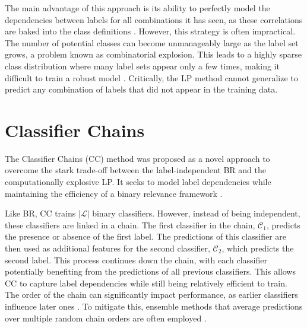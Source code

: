 The main advantage of this approach is its ability to perfectly model the dependencies between labels for all combinations it has seen, as these correlations are baked into the class definitions \cite{Sucar2014Multi-label}. However, this strategy is often impractical. The number of potential classes can become unmanageably large as the label set grows, a problem known as combinatorial explosion. This leads to a highly sparse class distribution where many label sets appear only a few times, making it difficult to train a robust model \cite{Cherman2011}. Critically, the LP method cannot generalize to predict any combination of labels that did not appear in the training data.

\section{Classifier Chains}
The Classifier Chains (CC) method was proposed as a novel approach to overcome the stark trade-off between the label-independent BR and the computationally explosive LP. It seeks to model label dependencies while maintaining the efficiency of a binary relevance framework \cite{Read2011}.

Like BR, CC trains $|\mathcal{L}|$ binary classifiers. However, instead of being independent, these classifiers are linked in a chain. The first classifier in the chain, $\mathcal{C}_1$, predicts the presence or absence of the first label. The predictions of this classifier are then used as additional features for the second classifier, $\mathcal{C}_2$, which predicts the second label. This process continues down the chain, with each classifier potentially benefiting from the predictions of all previous classifiers. This allows CC to capture label dependencies while still being relatively efficient to train. \cite{Read2011} The order of the chain can significantly impact performance, as earlier classifiers influence later ones \cite{Read2021}. To mitigate this, ensemble methods that average predictions over multiple random chain orders are often employed \cite{Sucar2014Multi-label,Zhang2018}.

